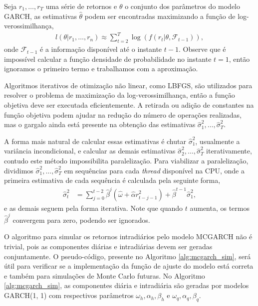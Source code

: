 \documentclass{article}
\begin{document}
Seja $r_{1}, \dots, r_{T}$ uma série de retornos e $\theta$ o conjunto dos parâmetros do modelo GARCH, as estimativas $\hat{\theta}$ podem ser encontradas maximizando a função de log-verossimilhança,
\begin{align*}
    l(\theta | r_{1}, \dots, r_{n})
    \approx \sum_{t=2}^{T} \log(f(r_{t} | \theta, \mathcal{F}_{t-1})),
\end{align*}
onde $\mathcal{F}_{t-1}$ é a informação disponível até o instante $t-1$. Observe que é impossível calcular a função densidade de probabilidade no instante $t=1$, então ignoramos o primeiro termo e trabalhamos com a aproximação.

Algoritmos iterativos de otimização não linear, como LBFGS, são utilizados para resolver o problema de maximização da log-verossimilhança, então a função objetiva deve ser executada eficientemente. A retirada ou adição de constantes na função objetiva podem ajudar na redução do número de operações realizadas, mas o gargalo ainda está presente na obtenção das estimativas $\hat{\sigma}_{1}^{2}, \dots, \hat{\sigma}_{T}^{2}$.

A forma mais natural de calcular essas estimativas é chutar $\hat{\sigma}_{1}^{2}$, usualmente a variância incondicional, e calcular as demais estimativas $\hat{\sigma}_{2}^{2}, \dots, \hat{\sigma}_{T}^{2}$ iterativamente, contudo este método impossibilita paralelização. Para viabilizar a paralelização, dividimos $\hat{\sigma}_{1}^{2}, \dots, \hat{\sigma}_{T}^{2}$ em sequências para cada \textit{thread} disponível na CPU, onde a primeira estimativa de cada sequência é calculada pela seguinte forma,
\begin{align*}
    \hat{\sigma}_{t}^{2} &= \sum_{j=0}^{t-2} \hat{\beta}^{j} (\hat{\omega} + \hat{\alpha} r_{t-j-1}^{2}) + \hat{\beta}^{t-1} \hat{\sigma}_{1}^{2},
\end{align*}
e as demais seguem pela forma iterativa. Note que quando $t$ aumenta, os termos $\hat{\beta}^{j}$ convergem para zero, podendo ser ignorados.

O algoritmo para simular os retornos intradiários pelo modelo MCGARCH não é trivial, pois as componentes diárias e intradiárias devem ser geradas conjuntamente. O pseudo-código, presente no Algoritmo \ref{alg:mcgarch_sim}, será útil para verificar se a implementação da função de ajuste do modelo está correta e também para simulações de Monte Carlo futuras. No Algoritmo \ref{alg:mcgarch_sim}, as componentes diária e intradiária são geradas por modelos GARCH(1, 1) com respectivos parâmetros $\omega_{h}, \alpha_{h}, \beta_{h}$ e $\omega_{q}, \alpha_{q}, \beta_{q}$.
\end{document}
